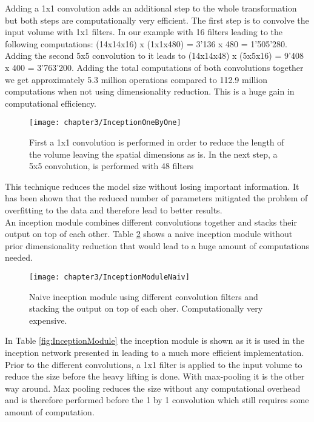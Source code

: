 Adding a 1x1 convolution adds an additional step to the whole transformation but both steps are computationally very efficient. The first step is to convolve the input volume with 1x1 filters. In our example with 16 filters leading to the following computations: (14x14x16) x (1x1x480) = 3'136 x 480 = 1'505'280. Adding the second 5x5 convolution to it leads to (14x14x48) x (5x5x16) = 9'408 x 400 = 3'763'200. Adding the total computations of both convolutions together we get approximately 5.3 million operations compared to 112.9 million computations when not using dimensionality reduction. This is a huge gain in computational efficiency.

\begin{figure}[H]
  \centering
  \caption{First a 1x1 convolution is performed in order to reduce the length of the volume leaving the spatial dimensions as is. In the next step, a 5x5 convolution, is performed with 48 filters \cite{ReviewGoogleLeNetv1}}
  \texttt{[image: chapter3/InceptionOneByOne]}
  \label{fig:parameters}
\end{figure}

This technique reduces the model size without losing important information. It has been shown that the reduced number of parameters mitigated the problem of overfitting to the data and therefore lead to better results. \\

An inception module combines different convolutions together and stacks their output on top of each other. Table \ref{fig:InceptionModuleNaiv} shows a naive inception module without prior dimensionality reduction that would lead to a huge amount of computations needed. 

\begin{figure}[H]
  \centering
  \caption{Naive inception module using different convolution filters and stacking the output on top of each oher. Computationally very expensive. \cite{ReviewGoogleLeNetv1}}
  \texttt{[image: chapter3/InceptionModuleNaiv]}
  \label{fig:InceptionModuleNaiv}
\end{figure}

In Table \ref{fig:InceptionModule} the inception module is shown as it is used in the inception network presented in \cite{szegedy2015going} leading to a much more efficient implementation. Prior to the different convolutions, a 1x1 filter is applied to the input volume to reduce the size before the heavy lifting is done. With max-pooling it is the other way around. Max pooling reduces the size without any computational overhead and is therefore performed before the 1 by 1 convolution which still requires some amount of computation.\\



